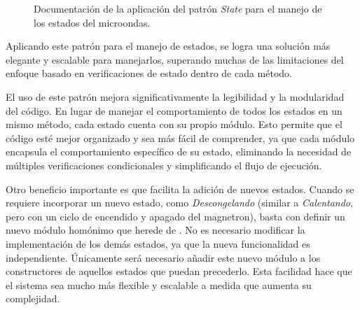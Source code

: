 \begin{figure}
\caption{Documentación de la aplicación del patrón \textit{State} para el manejo de los estados del microondas.}
\label{docState}
\end{figure}


Aplicando este patrón para el manejo de estados, se logra una solución más elegante y escalable para manejarlos, superando muchas de las limitaciones del enfoque basado en verificaciones de estado dentro de cada método.

El uso de este patrón mejora significativamente la legibilidad y la modularidad del código. En lugar de manejar el comportamiento de todos los estados en un mismo método, cada estado cuenta con su propio módulo. Esto permite que el código esté mejor organizado y sea más fácil de comprender, ya que cada módulo encapsula el comportamiento específico de su estado, eliminando la necesidad de múltiples verificaciones condicionales y simplificando el flujo de ejecución.

Otro beneficio importante es que facilita la adición de nuevos estados. Cuando se requiere incorporar un nuevo estado, como \textit{Descongelando} (similar a \textit{Calentando}, pero con un ciclo de encendido y apagado del \gls{magnetron}), basta con definir un nuevo módulo homónimo que herede de \EstadoMicroondas. No es necesario modificar la implementación de los demás estados, ya que la nueva funcionalidad es independiente. Únicamente será necesario añadir este nuevo módulo a los constructores de aquellos estados que puedan precederlo. Esta facilidad hace que el sistema sea mucho más flexible y escalable a medida que aumenta su complejidad.

